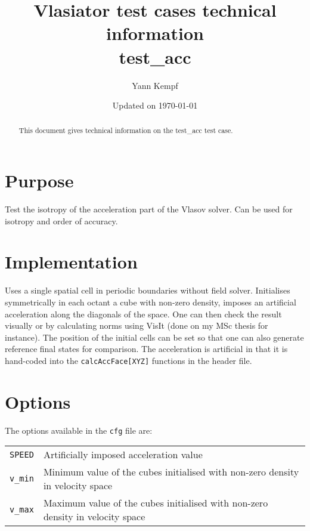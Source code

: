 \documentclass[a4paper,10pt]{scrartcl}
\title{
\Huge{Vlasiator test cases technical information} \\
\LARGE{test\_acc}
}
\author{Yann Kempf}
\date{Updated on \today}
\begin{document}
\maketitle

\begin{abstract}
   This document gives technical information on the test\_acc test case.
\end{abstract}

\section{Purpose}
Test the isotropy of the acceleration part of the Vlasov solver. Can be used for isotropy and order of accuracy.

\section{Implementation}
Uses a single spatial cell in periodic boundaries without field solver. Initialises symmetrically in each octant a cube with non-zero density, imposes an artificial acceleration along the diagonals of the space. One can then check the result visually or by calculating norms using VisIt (done on my MSc thesis for instance). The position of the initial cells can be set so that one can also generate reference final states for comparison. The acceleration is artificial in that it is hand-coded into the \verb=calcAccFace[XYZ]= functions in the header file.

\section{Options}
The options available in the \verb=cfg= file are:

\begin{tabularx}{\textwidth}{lX}
   \verb=SPEED= & Artificially imposed acceleration value \\
   \verb=v_min= & Minimum value of the cubes initialised with non-zero density in velocity space \\
   \verb=v_max= & Maximum value of the cubes initialised with non-zero density in velocity space
\end{tabularx}
\end{document}
